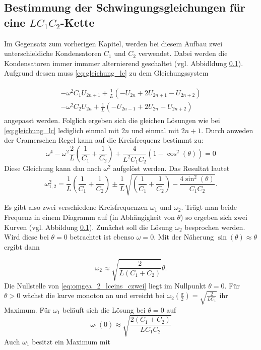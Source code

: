 \subsection{Bestimmung der Schwingungsgleichungen für eine $LC_1C_2$-Kette}
Im Gegensatz zum vorherigen Kapitel, werden bei diesem Aufbau zwei unterschieldiche 
Kondensatoren $C_1$ und $C_2$ verwendet. Dabei werden die Kondensatoren immer
immmer alternierend geschaltet (vgl. Abbidldung \ref{}).
Aufgrund dessen muss \eqref{eq:gleichung_lc} zu dem Gleichungssystem

\begin{align}
\label{eq:lc1c2_gleichungsy}
\begin{aligned}
-\omega^2C_1U_{2n+1}+\frac{1}{L}\left(-U_{2n}+2U_{2n+1}-U_{2n+2}\right)\\
-\omega^2C_2U_{2n}+\frac{1}{L}\left(-U_{2n-1}+2U_{2n}-U_{2n+2}\right)
\end{aligned}
\end{align}
angepasst werden.
Folglich ergeben sich die gleichen Lösungen wie bei \eqref{eq:gleichung_lc}
lediglich einmal mit $2n$ und einmal mit $2n+1$.
Durch anweden der Cramerschen Regel kann auf die Kreisfrequenz bestimmt 
zu:
\begin{equation*}
\omega^4-\omega^2\frac{2}{L}\left(\frac{1}{C_1}+\frac{1}{C_2}\right)+\frac{4}{L^2C_1C_2}\left(1-\cos^2(\theta)\right)=0
\end{equation*}
Diese Gleichung kann dan nach $\omega^2$ aufgelöst werden.
Das Resultat lautet
\begin{equation}
\label{eq:omgea_ceins_czwei}
\omega_{1,2}^{2}=\frac{1}{L}\left(\frac{1}{C_1}+\frac{1}{C_2}\right)\pm\frac{1}{L}\sqrt{\left(\frac{1}{C_1}+\frac{1}{C_2}\right)-\frac{4\sin^2(\theta)}{C_1C_2}}.
\end{equation}

Es gibt also zwei verschiedene Kreisfrequenzen $\omega_1$ und $\omega_2$.
Trägt man beide Frequenz in einem Diagramm auf (in Abhängigkeit von $\theta$) so ergeben sich 
zwei Kurven (vgl. Abbildung \ref{}). 
Zunächst soll die Lösung $\omega_2$ besprochen werden.
Wird diese bei $\theta=0$ betrachtet ist ebenso $\omega=0$.
Mit der Näherung $\sin(\theta)\approx\theta$ ergibt dann

\begin{equation}
\label{eq:omgea_2_lceins_czwei}
\omega_2\approx\sqrt{\frac{2}{L\left(C_1+C_2\right)}}\theta.
\end{equation}
Die Nullstelle von \eqref{eq:omgea_2_lceins_czwei} liegt im Nullpunkt $\theta=0$.
Für $\theta>0$ wächst die kurve monoton an und erreicht bei $\omega_2(\frac{\pi}{2})=\sqrt{\frac{2}{LC_1}}$
ihr Maximum.
Für $\omega_1$ beläuft sich die Lösung bei $\theta=0$ auf
\begin{equation*}
\omega_1(0)\approx\sqrt{\frac{2(C_1+C_2)}{LC_1C_2}}
\end{equation*}
Auch $\omega_1$ besitzt ein Maximum mit

